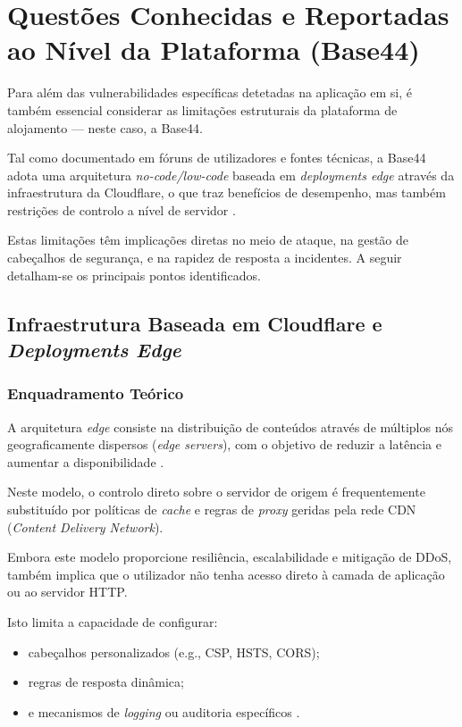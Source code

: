 \section{Questões Conhecidas e Reportadas ao Nível da Plataforma (Base44)}

Para além das vulnerabilidades específicas detetadas na aplicação em si, é também essencial considerar as limitações estruturais da plataforma de alojamento — neste caso, a Base44.

Tal como documentado em fóruns de utilizadores e fontes técnicas, a Base44 adota uma arquitetura \textit{no-code/low-code} baseada em \textit{deployments edge} através da infraestrutura da Cloudflare, o que traz benefícios de desempenho, mas também restrições de controlo a nível de servidor \cite{ref16, ref2}.

Estas limitações têm implicações diretas no meio de ataque, na gestão de cabeçalhos de segurança, e na rapidez de resposta a incidentes. A seguir detalham-se os principais pontos identificados.

\subsection{Infraestrutura Baseada em Cloudflare e \textit{Deployments Edge}}

\subsubsection{Enquadramento Teórico}

A arquitetura \textit{edge} consiste na distribuição de conteúdos através de múltiplos nós geograficamente dispersos (\textit{edge servers}), com o objetivo de reduzir a latência e aumentar a disponibilidade \cite{ref17}.

Neste modelo, o controlo direto sobre o servidor de origem é frequentemente substituído por políticas de \textit{cache} e regras de \textit{proxy} geridas pela rede CDN (\textit{Content Delivery Network}).

Embora este modelo proporcione resiliência, escalabilidade e mitigação de DDoS, também implica que o utilizador não tenha acesso direto à camada de aplicação ou ao servidor HTTP.

Isto limita a capacidade de configurar:

\begin{itemize}

\item cabeçalhos personalizados (e.g., CSP, HSTS, CORS);

\item regras de resposta dinâmica;

\item e mecanismos de \textit{logging} ou auditoria específicos \cite{ref18}.

\end{itemize}

